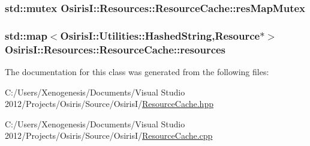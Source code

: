 \hypertarget{class_osiris_i_1_1_resources_1_1_resource_cache_a57c2ffced9afd28d9f541747e53bc9bf}{
\subsubsection[{res\-Map\-Mutex}]{\setlength{\rightskip}{0pt plus 5cm}std\-::mutex Osiris\-I\-::\-Resources\-::\-Resource\-Cache\-::res\-Map\-Mutex\hspace{0.3cm}{\ttfamily [protected]}}}\label{class_osiris_i_1_1_resources_1_1_resource_cache_a57c2ffced9afd28d9f541747e53bc9bf}
\hypertarget{class_osiris_i_1_1_resources_1_1_resource_cache_aa1eebb4cc887d87aa5c9089c09b9893f}{
\subsubsection[{resources}]{\setlength{\rightskip}{0pt plus 5cm}std\-::map$<${\bf Osiris\-I\-::\-Utilities\-::\-Hashed\-String},{\bf Resource}$\ast$$>$ Osiris\-I\-::\-Resources\-::\-Resource\-Cache\-::resources\hspace{0.3cm}{\ttfamily [protected]}}}\label{class_osiris_i_1_1_resources_1_1_resource_cache_aa1eebb4cc887d87aa5c9089c09b9893f}


The documentation for this class was generated from the following files\-:\begin{DoxyCompactItemize}
\item 
C\-:/\-Users/\-Xenogenesis/\-Documents/\-Visual Studio 2012/\-Projects/\-Osiris/\-Source/\-Osiris\-I/\hyperlink{_resource_cache_8hpp}{Resource\-Cache.\-hpp}\item 
C\-:/\-Users/\-Xenogenesis/\-Documents/\-Visual Studio 2012/\-Projects/\-Osiris/\-Source/\-Osiris\-I/\hyperlink{_resource_cache_8cpp}{Resource\-Cache.\-cpp}\end{DoxyCompactItemize}
